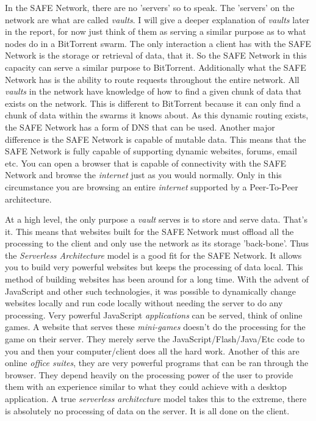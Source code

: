 In the SAFE Network, there are no 'servers' so to speak. The 'servers' on the network are what are called \textit{vaults}. I will give a deeper explanation of \textit{vaults} later in the report, for now just think of them as serving a similar purpose as to what nodes do in a BitTorrent swarm.  The only interaction a client has with the SAFE Network is the storage or retrieval of data, that it. So the SAFE Network in this capacity can serve a similar purpose to BitTorrent. Additionally what the SAFE Network has is the ability to route requests throughout the entire network. All \textit{vaults} in the network have knowledge of how to find a given chunk of data that exists on the network. This is different to BitTorrent because it can only find a chunk of data within the swarms it knows about. As this dynamic routing exists, the SAFE Network has a form of DNS that can be used. Another major difference is the SAFE Network is capable of mutable data. This means that the SAFE Network is fully capable of supporting dynamic websites, forums, email etc. You can open a browser that is capable of connectivity with the SAFE Network and browse the \textit{internet} just as you would normally. Only in this circumstance you are browsing an entire \textit{internet} supported by a Peer-To-Peer architecture.

At a high level, the only purpose a \textit{vault} serves is to store and serve data. That's it. This means that websites built for the SAFE Network must offload all the processing to the client and only use the network as its storage 'back-bone'. Thus the \textit{Serverless Architecture} model is a good fit for the SAFE Network. It allows you to build very powerful websites but keeps the processing of data local. This method of building websites has been around for a long time. With the advent of JavaScript and other such technologies, it was possible to dynamically change websites locally and run code locally without needing the server to do any processing. Very powerful JavaScript \textit{applications} can be served, think of online games. A website that serves these \textit{mini-games} doesn't do the processing for the game on their server. They merely serve the JavaScript/Flash/Java/Etc code to you and then your computer/client does all the hard work. Another of this are online \textit{office suites}, they are very powerful programs that can be ran through the browser. They depend heavily on the processing power of the user to provide them with an experience similar to what they could achieve with a desktop application. A true \textit{serverless architecture} model takes this to the extreme, there is absolutely no processing of data on the server. It is all done on the client. 

